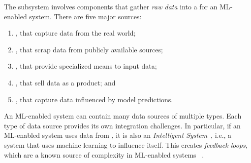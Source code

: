   The  subsystem involves components that
  gather \emph{raw data} into a  for an
  ML-enabled system. There are five major sources:
  \begin{enumerate}
    \item {},
          that capture data from the real world;
    \item {},
          that scrap data from publicly available sources;
    \item {},
          that provide specialized means to input data;
    \item {},
          that sell data as a product; and
    \item {},
          that capture data influenced by model predictions.
  \end{enumerate}

  An ML-enabled system can contain many data sources of multiple types.
  Each type of data source provides its own integration challenges.
  In particular, if an ML-enabled system uses data from
  , it is also an
  \emph{Intelligent System}~\parencite{Hulten2018BuildingEngineering},
  i.e., a system that uses machine learning to influence itself.
  This creates \emph{feedback loops}, which are a known source of
  complexity in ML-enabled systems%
  ~\parencite{Menshawy2024NavigatingDeployment,Sculley2015HiddenSystems}.

